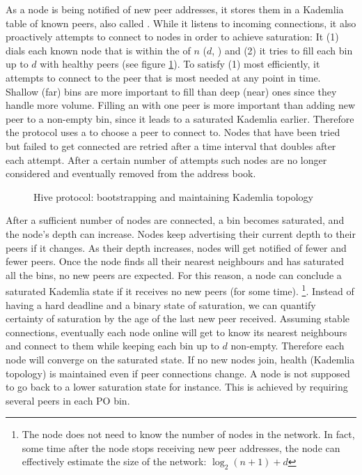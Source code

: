 As a node is being notified of new peer addresses, it stores them in a Kademlia table of known peers, also called . While it listens to incoming connections, it also proactively attempts to connect to nodes in order to achieve saturation: It (1) dials each known node that is within the  of $n$  ($d$, ) and (2) it tries to fill each bin up to $d$ with healthy peers (see figure \ref{fig:bootstrapping-kademlia}). To satisfy (1) most efficiently, it attempts to connect to the peer that is most needed at any point in time. Shallow (far) bins are more important to fill than deep (near) ones since they handle more volume. Filling an  with one peer is more important than adding new peer to a non-empty bin, since it leads to a saturated Kademlia earlier. Therefore the protocol uses a  to choose a peer to connect to.   Nodes that have been tried but failed to get connected are retried after a time interval that doubles after each attempt. After a certain number of attempts such nodes are no longer considered and eventually removed from the address book.


\begin{figure}[htbp]
   \centering
   \caption[Hive protocol: bootstrapping and maintaining Kademlia topology]{Hive protocol: bootstrapping and maintaining Kademlia topology}
   \label{fig:bootstrapping-kademlia}
\end{figure}

After a sufficient number of nodes are connected, a bin becomes saturated, and the node's depth can increase. Nodes keep advertising their current depth to their peers if it changes. As their depth increases, nodes will get notified of fewer and fewer peers. Once the node finds all their nearest neighbours and has saturated all the bins, no new peers are expected. For this reason, a node can conclude a saturated Kademlia state if it receives no new peers (for some time).%
%
\footnote{The node does not need to know the number of nodes in the network. In fact, some time after the node stops receiving new peer addresses, the node can effectively estimate the size of the network: $\log_2(n+1)+ d$}.
%
Instead of having a hard deadline and a binary state of saturation, we can quantify certainty of saturation by the age of the last new peer received. Assuming stable connections, eventually each node online will get to know its nearest neighbours and connect to them while keeping each bin up to $d$ non-empty. Therefore each node will converge on the saturated state. If no new nodes join, health (Kademlia topology) is maintained even if peer connections change. A node is not supposed to go back to a lower saturation state for instance. This is achieved by requiring several peers in each PO bin. 

